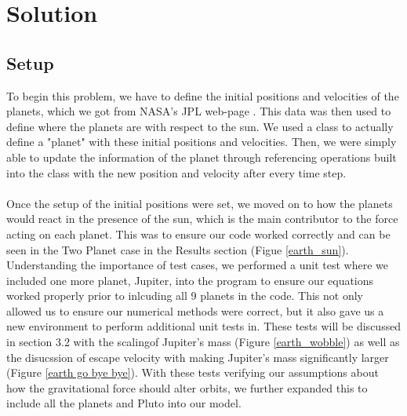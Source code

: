 \documentclass{article}
\begin{document}
\section{Solution}

\subsection{Setup}
To begin this problem, we have to define the initial positions and velocities of the planets, which we got from NASA's JPL web-page \cite{JPL}. This data was then used to define where the planets are with respect to the sun. We used a class to actually define a "planet" with these initial positions and velocities. Then, we were simply able to update the information of the planet through referencing operations built into the class with the new position and velocity after every time step. \\
\\
Once the setup of the initial positions were set, we moved on to how the planets would react in the presence of the sun, which is the main contributor to the force acting on each planet. This was to ensure our code worked correctly and can be seen in the Two Planet case in the Results section (Figue \ref{earth_sun}). Understanding the importance of test cases, we performed a unit test where we included one more planet, Jupiter, into the program to ensure our equations worked properly prior to inlcuding all 9 planets in the code. This not only allowed us to ensure our numerical methods were correct, but it also gave us a new environment to perform additional unit tests in. These tests will be discussed in section 3.2 with the scalingof Jupiter's mass (Figure \ref{earth_wobble}) as well as the disucssion of escape velocity with making Jupiter's mass significantly larger (Figure \ref{earth go bye bye}). With these tests verifying our assumptions about how the gravitational force should alter orbits, we further expanded this to include all the planets and Pluto into our model.\\
\end{document}
